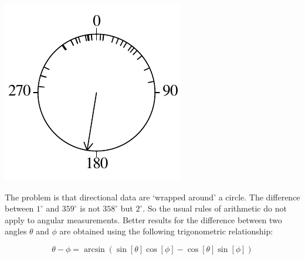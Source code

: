 \noindent\begin{minipage}[t][][b]{.2\textwidth}
\includegraphics[width=\textwidth]{../figures/circle2.pdf}\\
\end{minipage}
\begin{minipage}[t][][t]{.8\textwidth}
  \label{fig:circle2}
\end{minipage}

The problem is that directional data are `wrapped around' a circle.
The difference between $1^{\circ}$ and $359^{\circ}$ is not
$358^{\circ}$ but $2^{\circ}$. So the usual rules of arithmetic do not
apply to angular measurements. Better results for the difference
between two angles $\theta$ and $\phi$ are obtained using the
following trigonometric relationship:

\begin{equation}
  \theta - \phi = \arcsin\left( \sin[\theta] \cos[\phi] -
                                \cos[\theta] \sin[\phi] \right)
  \label{eq:anglediff}
\end{equation}


